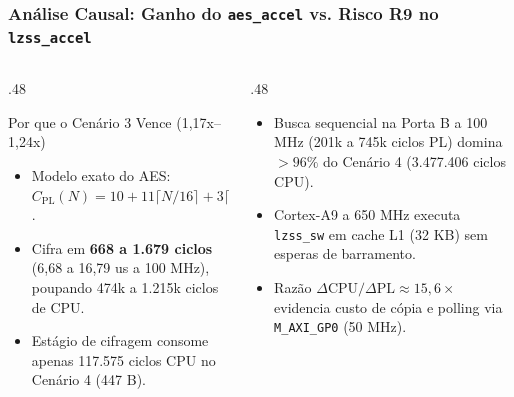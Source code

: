 \begin{frame}
  \frametitle{An\'alise Causal: Ganho do \texttt{aes\_accel} vs. Risco R9 no \texttt{lzss\_accel}}
  \begin{columns}[T]
    \begin{column}{.48\textwidth}
      \begin{block}{Por que o Cen\'ario 3 Vence (1,17x--1,24x)}
        \begin{itemize}
          \item Modelo exato do AES: $C_{\text{PL}}(N) = 10 + 11\lceil N/16\rceil + 3\lceil N/4\rceil$.
          \item Cifra em \textbf{668 a 1.679 ciclos} (6,68 a 16,79 us a 100 MHz), poupando 474k a 1.215k ciclos de CPU.
          \item Est\'agio de cifragem consome apenas 117.575 ciclos CPU no Cen\'ario 4 (447 B).
        \end{itemize}
      \end{block}
    \end{column}
    \begin{column}{.48\textwidth}
      \begin{pontoschave}
        \begin{itemize}
          \item Busca sequencial na Porta B a 100 MHz (201k a 745k ciclos PL) domina $>96\%$ do Cen\'ario 4 (3.477.406 ciclos CPU).
          \item Cortex-A9 a 650 MHz executa \texttt{lzss\_sw} em cache L1 (32 KB) sem esperas de barramento.
          \item Raz\~ao $\Delta\text{CPU}/\Delta\text{PL} \approx 15{,}6\times$ evidencia custo de c\'opia e polling via \texttt{M\_AXI\_GP0} (50 MHz).
        \end{itemize}
      \end{pontoschave}
    \end{column}
  \end{columns}
\end{frame}
